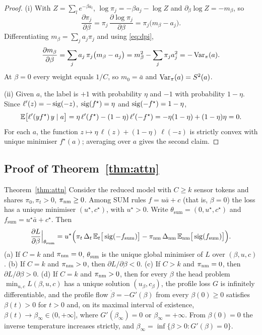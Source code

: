 \begin{proof}
(i) With $Z=\sum_le^{-\beta a_l}$, $\log\pi_j=-\beta a_j-\log Z$ and $\partial_\beta\log Z=-m_\beta$, so
\begin{equation}\label{eq:dpi}
  \frac{\partial\pi_j}{\partial\beta}=\pi_j\,\frac{\partial\log\pi_j}{\partial\beta}=\pi_j\big(m_\beta-a_j\big).
\end{equation}
Differentiating $m_\beta=\sum_ja_j\pi_j$ and using \cref{eq:dpi},
\begin{equation}\label{eq:dm2}
  \frac{\partial m_\beta}{\partial\beta}
  =\sum_ja_j\,\pi_j\big(m_\beta-a_j\big)
  =m_\beta^2-\sum_j\pi_ja_j^2
  =-\operatorname{Var}_{\pi}(a).
\end{equation}
At $\beta=0$ every weight equals $1/C$, so $m_0=\bar a$ and $\operatorname{Var}_\pi(a)=S^2(a)$.

(ii) Given $a$, the label is $+1$ with probability $\eta$ and $-1$ with probability $1-\eta$. Since $\ell'(z)=-\operatorname{sig}(-z)$, $\operatorname{sig}(f^\star)=\eta$ and $\operatorname{sig}(-f^\star)=1-\eta$,
\begin{equation}\label{eq:proper}
  \mathbb{E}\big[\ell'(yf^\star)\,y\mid a\big]
  =\eta\,\ell'(f^\star)-(1-\eta)\,\ell'(-f^\star)
  =-\eta(1-\eta)+(1-\eta)\eta=0 .
\end{equation}
For each $a$, the function $z\mapsto\eta\,\ell(z)+(1-\eta)\,\ell(-z)$ is strictly convex with unique minimiser $f^\star(a)$; averaging over $a$ gives the second claim.
\end{proof}

\subsection{Proof of Theorem~\ref*{thm:attn}}\label{app:thm3}

\begin{restated}{Theorem~\ref{thm:attn}}
Consider the reduced model with $C\ge k$ sensor tokens and shares $\pi_0,\pi_t>0$, $\pi_{\mathrm{nm}}\ge0$. Among SUM rules $f=u\bar a+c$ (that is, $\beta=0$) the loss has a unique minimiser $(u^\star,c^\star)$, with $u^\star>0$. Write $\theta_{\mathrm{sum}}=(0,u^\star,c^\star)$ and $f_{\mathrm{sum}}=u^\star\bar a+c^\star$. Then
\begin{equation}\label{eq:thm3}
  \frac{\partial L}{\partial\beta}\Big|_{\theta_{\mathrm{sum}}}
  =u^\star\Big(\pi_t\,\Delta_t\,\mathbb{E}_t\big[\operatorname{sig}(-f_{\mathrm{sum}})\big]-\pi_{\mathrm{nm}}\,\Delta_{\mathrm{nm}}\,\mathbb{E}_{\mathrm{nm}}\big[\operatorname{sig}(f_{\mathrm{sum}})\big]\Big).
\end{equation}
(a) If $C=k$ and $\pi_{\mathrm{nm}}=0$, $\theta_{\mathrm{sum}}$ is the unique global minimiser of $L$ over $(\beta,u,c)$. (b) If $C=k$ and $\pi_{\mathrm{nm}}>0$, then $\partial L/\partial\beta<0$. (c) If $C>k$ and $\pi_{\mathrm{nm}}=0$, then $\partial L/\partial\beta>0$. (d) If $C=k$ and $\pi_{\mathrm{nm}}>0$, then for every $\beta$ the head problem $\min_{u,c}L(\beta,u,c)$ has a unique solution $(u_\beta,c_\beta)$, the profile loss $G$ is infinitely differentiable, and the profile flow $\dot\beta=-G'(\beta)$ from every $\beta(0)\ge0$ satisfies $\beta(t)>0$ for $t>0$ and, on its maximal interval of existence, $\beta(t)\to\beta_\infty\in(0,+\infty]$, where $G'(\beta_\infty)=0$ or $\beta_\infty=+\infty$. From $\beta(0)=0$ the inverse temperature increases strictly, and $\beta_\infty=\inf\{\beta>0:G'(\beta)=0\}$.
\end{restated}

